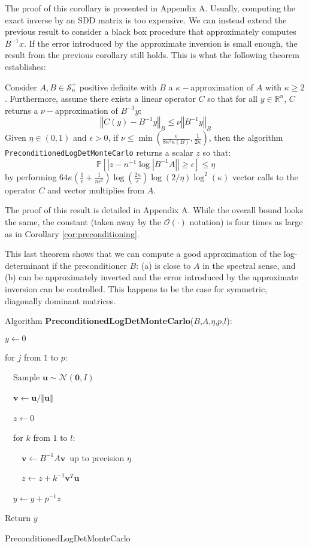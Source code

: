 The proof of this corollary is presented in Appendix A. Usually, computing
the exact inverse by an SDD matrix is too expensive. We can instead
extend the previous result to consider a black box procedure that
approximately computes $B^{-1}x$. If the error introduced by the
approximate inversion is small enough, the result from the previous
corollary still holds. This is what the following theorem establishes: 
\begin{theorem}
\label{thm:preconditioning-approx}Consider $A,B\in\mathcal{S}_{n}^{+}$
positive definite with $B$ a $\kappa-$approximation of $A$ with
$\kappa\geq2$. Furthermore, assume there exists a linear operator
$C$ so that for all $y\in\mathbb{R}^{n}$, $C$ returns a $\nu-$approximation
of $B^{-1}y$: 
\[
\left\Vert C\left(y\right)-B^{-1}y\right\Vert _{B}\leq\nu\left\Vert B^{-1}y\right\Vert _{B}
\]
Given $\eta\in\left(0,1\right)$ and $\epsilon>0$, if $\nu\leq\min\left(\frac{\epsilon}{8\kappa^{3}\kappa\left(B\right)},\frac{1}{2\kappa}\right)$,
then the algorithm \\
 \texttt{PreconditionedLogDetMonteCarlo} returns a scalar $z$ so
that: 
\[
\mathbb{P}\left[\left|z-n^{-1}\log\left|B^{-1}A\right|\right|\geq\epsilon\right]\leq\eta
\]
by performing $64\kappa\left(\frac{1}{\epsilon}+\frac{1}{n\epsilon^{2}}\right)\log\left(\frac{2\kappa}{\epsilon}\right)\log\left(2/\eta\right)\log^{2}\left(\kappa\right)$
vector calls to the operator $C$ and vector multiplies from $A$. 
\end{theorem}

The proof of this result is detailed in Appendix A. While the overall
bound looks the same, the constant (taken away by the $\mathcal{O}\left(\cdot\right)$
notation) is four times as large as in Corollary \ref{cor:preconditioning}.

This last theorem shows that we can compute a good approximation of
the log-determinant if the preconditioner $B$: (a) is close to $A$
in the spectral sense, and (b) can be approximately inverted and the
error introduced by the approximate inversion can be controlled. This
happens to be the case for symmetric, diagonally dominant matrices.

\begin{algorithm}
Algorithm \textbf{PreconditionedLogDetMonteCarlo}($B$,$A$,$\eta$,$p$,$l$):

$y\leftarrow0$

for $j$ from $1$ to $p$:

~~Sample $\mathbf{u}\sim\mathcal{N}\left(\mathbf{0},I\right)$

~~$\mathbf{v}\leftarrow\mathbf{u}/\left\Vert \mathbf{u}\right\Vert $

~~$z\leftarrow0$

~~for $k$ from $1$ to $l$:

~~~~$\mathbf{v}\leftarrow B^{-1}A\mathbf{v}$~up to precision
$\eta$

~~~~$z\leftarrow z+k^{-1}\mathbf{v}^{T}\mathbf{u}$

~~$y\leftarrow y+p^{-1}z$

Return $y$

\caption{PreconditionedLogDetMonteCarlo\label{alg:SampleLogDet}}
\end{algorithm}

